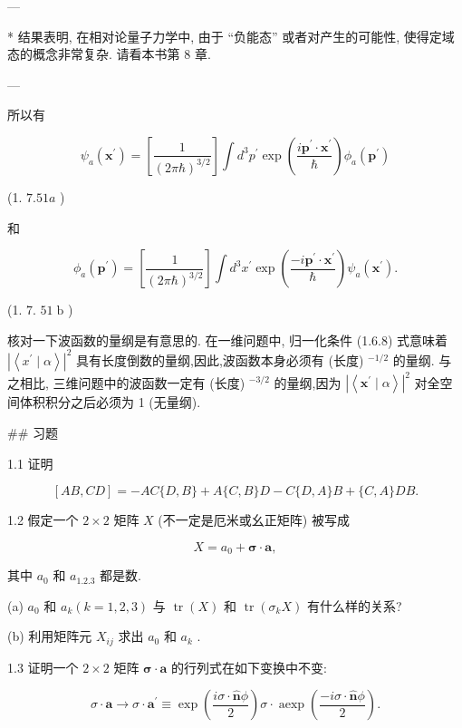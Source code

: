 \documentclass[lang=cn,newtx,10pt,scheme=chinese,thmcnt=section]{elegantbook}
\begin{document}
---

* 结果表明, 在相对论量子力学中, 由于 “负能态” 或者对产生的可能性, 使得定域态的概念非常复杂. 请看本书第 8 章.

---

所以有

$$
{\psi }_{a}\left( {\mathbf{x}}^{\prime }\right) = \left\lbrack \frac{1}{{\left( 2\pi \hbar \right) }^{3/2}}\right\rbrack \int {d}^{3}{p}^{\prime }\exp \left( \frac{i{\mathbf{p}}^{\prime } \cdot {\mathbf{x}}^{\prime }}{\hbar }\right) {\phi }_{a}\left( {\mathbf{p}}^{\prime }\right)
$$

(1. ${7.51a}$ )

和

$$
{\phi }_{a}\left( {\mathbf{p}}^{\prime }\right) = \left\lbrack \frac{1}{{\left( 2\pi \hbar \right) }^{3/2}}\right\rbrack \int {d}^{3}{x}^{\prime }\exp \left( \frac{-i{\mathbf{p}}^{\prime } \cdot {\mathbf{x}}^{\prime }}{\hbar }\right) {\psi }_{a}\left( {\mathbf{x}}^{\prime }\right) .
$$

(1. 7. ${51}\mathrm{\;b}$ )

核对一下波函数的量纲是有意思的. 在一维问题中, 归一化条件 (1.6.8) 式意味着 ${\left| \left\langle {x}^{\prime } \mid \alpha \right\rangle \right| }^{2}$ 具有长度倒数的量纲,因此,波函数本身必须有 (长度) ${}^{-1/2}$ 的量纲. 与之相比, 三维问题中的波函数一定有 (长度) ${}^{-3/2}$ 的量纲,因为 ${\left| \left\langle {\mathbf{x}}^{\prime } \mid \alpha \right\rangle \right| }^{2}$ 对全空间体积积分之后必须为 1 (无量纲).

## 习题

1.1 证明

$$
\left\lbrack {{AB},{CD}}\right\rbrack = - {AC}\{ D, B\} + A\{ C, B\} D - C\{ D, A\} B + \{ C, A\} {DB}.
$$

1.2 假定一个 $2 \times 2$ 矩阵 $X$ (不一定是厄米或幺正矩阵) 被写成

$$
X = {a}_{0} + \mathbf{\sigma } \cdot \mathbf{a},
$$

其中 ${a}_{0}$ 和 ${a}_{1.2.3}$ 都是数.

(a) ${a}_{0}$ 和 ${a}_{k}\left( {k = 1,2,3}\right)$ 与 $\operatorname{tr}\left( X\right)$ 和 $\operatorname{tr}\left( {{\sigma }_{k}X}\right)$ 有什么样的关系?

(b) 利用矩阵元 ${X}_{ij}$ 求出 ${a}_{0}$ 和 ${a}_{k}$ .

1.3 证明一个 $2 \times 2$ 矩阵 $\mathbf{\sigma } \cdot \mathbf{a}$ 的行列式在如下变换中不变:

$$
\sigma \cdot \mathbf{a} \rightarrow \sigma \cdot {\mathbf{a}}^{\prime } \equiv \exp \left( \frac{{i\sigma } \cdot \widehat{\mathbf{n}}\phi }{2}\right) \sigma \cdot \operatorname{aexp}\left( \frac{-{i\sigma } \cdot \widehat{\mathbf{n}}\phi }{2}\right) .
$$
\end{document}
